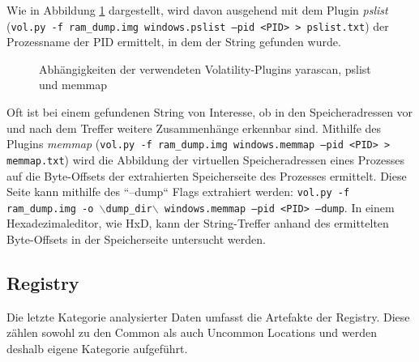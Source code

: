 Wie in Abbildung \ref{img:volatility-plugins} dargestellt, wird davon ausgehend mit dem Plugin \textit{pslist} (\texttt{vol.py -f ram\_dump.img windows.pslist --pid <PID> > pslist.txt}) der Prozessname der PID ermittelt, in dem der String gefunden wurde.
\begin{figure}[h!]
	\centering
	\small
	\centerline{\resizebox{\linewidth}{!}{}}
	\caption{Abhängigkeiten der verwendeten Volatility-Plugins yarascan, pslist und memmap}
	\label{img:volatility-plugins}
\end{figure}
Oft ist bei einem gefundenen String von Interesse, ob in den Speicheradressen vor und nach dem Treffer weitere Zusammenhänge erkennbar sind.
Mithilfe des Plugins \textit{memmap} (\texttt{vol.py -f ram\_dump.img windows.memmap --pid <PID> > memmap.txt}) wird die Abbildung der virtuellen Speicheradressen eines Prozesses auf die Byte-Offsets der extrahierten Speicherseite des Prozesses ermittelt.
Diese Seite kann mithilfe des ``--dump`` Flags extrahiert werden: \texttt{vol.py -f ram\_dump.img -o $\backslash$dump\_dir$\backslash$ windows.memmap --pid <PID> --dump}.
In einem Hexadezimaleditor, wie HxD, kann der String-Treffer anhand des ermittelten Byte-Offsets in der Speicherseite untersucht werden.

\subsection{Registry}
\label{subsection:methodik-datenanalyse-registry}
Die letzte Kategorie analysierter Daten umfasst die Artefakte der Registry.
Diese zählen sowohl zu den Common als auch Uncommon Locations und werden deshalb eigene Kategorie aufgeführt.

